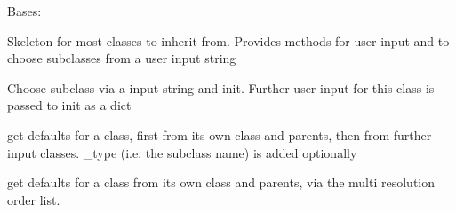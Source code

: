 \documentclass[letterpaper,10pt,english]{sphinxmanual}
\begin{document}
\begin{fulllineitems}
\label{\detokenize{helpers:helpers.baseclass.BaseClass}}
Bases: 

Skeleton for most classes to inherit from.
Provides methods for user input and to choose subclasses from a 
user input string

\begin{fulllineitems}
\label{\detokenize{helpers:helpers.baseclass.BaseClass.create}}
Choose subclass via a input string and init.
Further user input for this class is passed to init as a dict

\end{fulllineitems}


\begin{fulllineitems}
\label{\detokenize{helpers:helpers.baseclass.BaseClass.defaults}}
get defaults for a class, first from its own class and parents, 
then from further input classes.
\_type (i.e. the subclass name) is added optionally

\end{fulllineitems}


\begin{fulllineitems}
\label{\detokenize{helpers:helpers.baseclass.BaseClass.defaults_class}}
get defaults for a class from its own class and parents, 
via the multi resolution order list.


\end{fulllineitems}
\end{fulllineitems}
\end{document}
